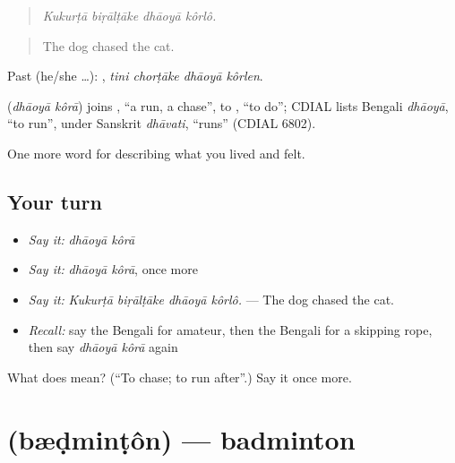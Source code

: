 \begin{quote}
\emph{Kukurṭā biṛālṭāke dhāoyā kôrlô.}
\end{quote}

\begin{quote}
The dog chased the cat.
\end{quote}

Past (he/she …):    , \emph{tini chorṭāke dhāoyā kôrlen}.

\begin{cousinweb}
\textbf{ } (\emph{dhāoyā kôrā}) joins , \textquotedblleft{}a run, a chase\textquotedblright{}, to , \textquotedblleft{}to do\textquotedblright{}; CDIAL lists Bengali \emph{dhāoyā}, \textquotedblleft{}to run\textquotedblright{}, under Sanskrit \emph{dhāvati}, \textquotedblleft{}runs\textquotedblright{} (CDIAL 6802).
\end{cousinweb}

\begin{grammarlens}[title={What you've built}]
One more word for describing what you lived and felt.
\end{grammarlens}

\subsection*{Your turn}
\begin{itemize}
\raggedright
  \item \emph{Say it:} \emph{dhāoyā kôrā}
  \item \emph{Say it:} \emph{dhāoyā kôrā}, once more
  \item \emph{Say it:} \emph{Kukurṭā biṛālṭāke dhāoyā kôrlô.} — The dog chased the cat.
  \item \emph{Recall:} say the Bengali for amateur, then the Bengali for a skipping rope, then say \emph{dhāoyā kôrā} again
\end{itemize}

\begin{tcolorbox}[breakable,colback=teal!4,colframe=teal!35!black,title={Before you move on}]
What does   mean? (\textquotedblleft{}To chase; to run after\textquotedblright{}.) Say it once more.
\end{tcolorbox}
\section[\texorpdfstring{\bn{ব্যাডমিন্টন} (bæḍminṭôn)}{ব্যাডমিন্টন (bæḍminṭôn)}]{ (bæḍminṭôn) — badminton}


